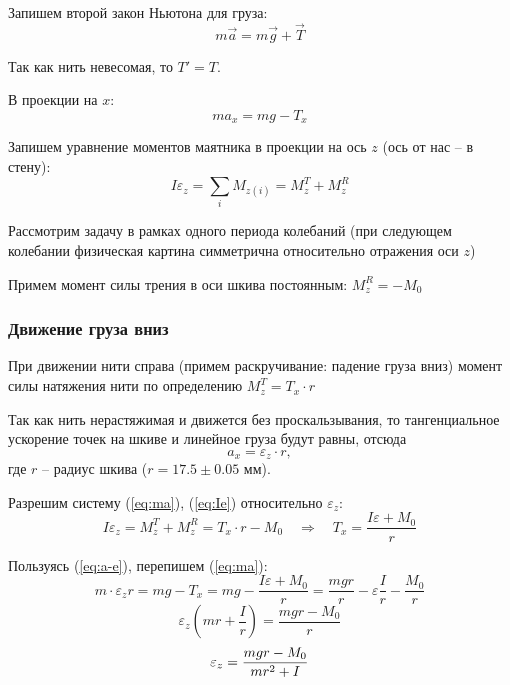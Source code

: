 \documentclass[a4paper,12pt]{article}
\begin{document}
Запишем второй закон Ньютона для груза:
\begin{equation}
	m\vec{a}=m\vec{g}+\vec{T}
\end{equation}

Так как нить невесомая, то $T'=T$.

В проекции на $x$:
\begin{equation}
	\label{eq:ma}
	ma_x=mg-T_x
\end{equation}

Запишем уравнение моментов маятника в проекции на ось $z$ (ось от нас -- в стену):
\begin{equation}
	\label{eq:Ie}
	I\varepsilon_z=\sum_i M_{z(i)}=M_z^{T}+M_z^{R}
\end{equation}

Рассмотрим задачу в рамках одного периода колебаний (при следующем колебании физическая картина симметрична относительно отражения оси $z$)

Примем момент силы трения в оси шкива постоянным: $M_z^{R}=-M_0$

\subsubsection{Движение груза вниз} %

При движении нити справа (примем раскручивание: падение груза вниз) момент силы натяжения нити по определению $M_z^{T}=T_x\cdot r$

Так как нить нерастяжимая и движется без проскальзывания, то тангенциальное ускорение точек на шкиве и линейное груза будут равны, отсюда
\begin{equation}
	\label{eq:a-e}
	a_x=\varepsilon_z\cdot r,
\end{equation}   
где $r$ -- радиус шкива ($r=17.5\pm0.05$ мм).

Разрешим систему (\ref{eq:ma}), (\ref{eq:Ie}) относительно $\varepsilon_z$:
\begin{equation}
	I\varepsilon_z=M_z^{T}+M_z^{R}=T_x\cdot r -M_0\quad \Rightarrow \quad
	T_x=\frac{I \varepsilon + M_0}{r}
\end{equation}

Пользуясь (\ref{eq:a-e}), перепишем (\ref{eq:ma}):
\begin{equation}
	m\cdot \varepsilon_z r = mg - T_x = mg - \frac{I \varepsilon + M_0}{r}=\frac{mgr}{r}-\varepsilon\frac{I}{r}-\frac{M_0}{r}
\end{equation}
\begin{equation}
	\varepsilon_z(mr+\frac{I}{r})=\frac{mgr-M_0}{r}
\end{equation}
\begin{equation}
	\label{eq:e-t}
	\varepsilon_z=\frac{mgr-M_0}{mr^2+I}\\
\end{equation}
\end{document}
